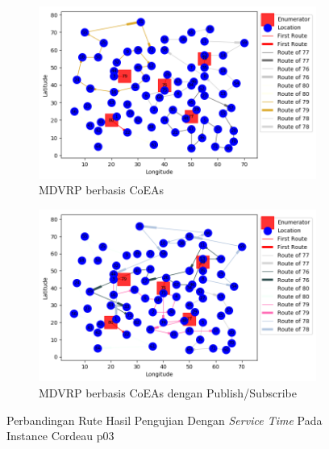 \begin{figure}[H]
	\centering
	\begin{subfigure}[t]{\textwidth}
		\centering
		\includegraphics[width=\textwidth]{Resources/Images/cordeau_p03_tw/cordeau_p03_tw_coes}
		\caption{MDVRP berbasis CoEAs}
		\label{fig:cordeau_p03_tw_coes}
	\end{subfigure}
	\begin{subfigure}[t]{\textwidth}
		\centering
		\includegraphics[width=\textwidth]{Resources/Images/cordeau_p03_tw/cordeau_p03_tw_pubsub_coes}
		\caption{MDVRP berbasis CoEAs dengan Publish/Subscribe}
		\label{fig:cordeau_p03_tw_pubsub_coes}
	\end{subfigure}
	\caption{Perbandingan Rute Hasil Pengujian Dengan \textit{Service Time} Pada Instance Cordeau p03}
	\label{fig:cordeau_p03_tw}
\end{figure}


